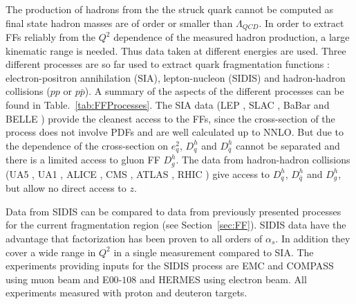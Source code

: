 The production of hadrons from the the struck quark cannot be computed as final state hadron masses are of order or smaller than $\Lambda_{QCD}$. In order to extract FFs reliably from the $Q^2$ dependence of the measured hadron production, a large kinematic range is needed. Thus data taken at different energies are used. Three different processes are so far used to extract quark fragmentation functions : electron-positron annihilation (SIA), lepton-nucleon (SIDIS) and hadron-hadron collisions ($pp$ or $p\bar{p}$). A summary of the aspects of the different processes can be found in Table.~\ref{tab:FFProcesses}. The SIA data (LEP \cite{LEP1,LEP2,LEP3}, SLAC \cite{SLAC1}, BaBar \cite{BABAR} and BELLE \cite{BELLE}) provide the cleanest access to the FFs, since the cross-section of the process does not involve PDFs and are well calculated up to NNLO. But due to the dependence of the cross-section on $e^2_q$, $D^h_q$ and $D^h_{\bar{q}}$ cannot be separated and there is a limited access to gluon FF $D^h_g$. The data from hadron-hadron collisions (UA5 \cite{UA5}, UA1 \cite{UA1}, ALICE \cite{ALICE}, CMS \cite{CMS1,CMS2}, ATLAS \cite{ATLAS}, RHIC \cite{RHIC1,RHIC2,RHIC3}) give access to $D^h_q$, $D^h_{\bar{q}}$ and $D^h_g$, but allow no direct access to $z$.

Data from SIDIS can be compared to data from previously presented processes for the current fragmentation region (see Section~\ref{sec:FF}). SIDIS data have the advantage that factorization has been proven to all orders of $\alpha_s$. In addition they cover a wide range in $Q^2$ in a single measurement compared to SIA. The experiments providing inputs for the SIDIS process are EMC \cite{EMC} and COMPASS \cite{COMPASS2006Pi,COMPASS2006K} using muon beam and E$00$-$108$ \cite{E00108} and HERMES \cite{HERMESMult} using electron beam. All experiments measured with proton and deuteron targets.

